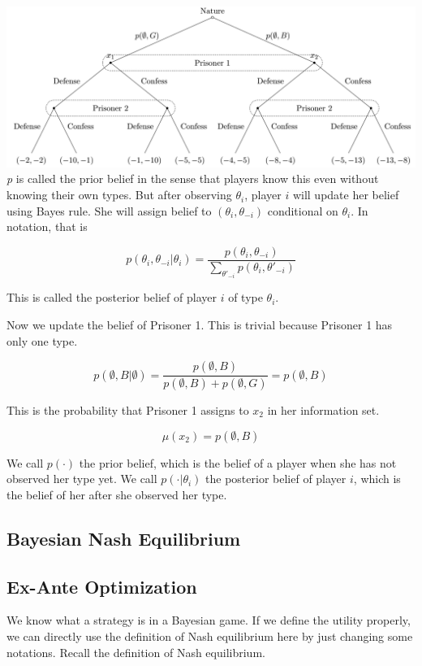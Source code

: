 \documentclass[12pt, oneside]{article}
\begin{document}
\includegraphics{Figure/incom_tree_bey2.png}
\textit{p} is called the prior belief in the sense that players know this even without knowing their own types. But after observing \( \theta_i \), player \( i \) will update her belief using Bayes rule. She will assign belief to \( (\theta_i, \theta_{-i}) \) conditional on \( \theta_i \). In notation, that is

\[
p(\theta_i, \theta_{-i} | \theta_i) = \frac{p(\theta_i, \theta_{-i})}{\sum_{\theta'_{-i}} p(\theta_i, \theta'_{-i})}
\]

This is called the posterior belief of player \( i \) of type \( \theta_i \).

Now we update the belief of Prisoner 1. This is trivial because Prisoner 1 has only one type.

\[
p(\emptyset, B | \emptyset) = \frac{p(\emptyset, B)}{p(\emptyset, B) + p(\emptyset, G)} = p(\emptyset, B)
\]

This is the probability that Prisoner 1 assigns to \( x_2 \) in her information set.

\[
\mu(x_2) = p(\emptyset, B)
\]

We call \( p(\cdot) \) the prior belief, which is the belief of a player when she has not observed her type yet. We call \( p(\cdot | \theta_i) \) the posterior belief of player \( i \), which is the belief of her after she observed her type.

\subsection{Bayesian Nash Equilibrium}
\subsection{Ex-Ante Optimization}
We know what a strategy is in a Bayesian game. If we define the utility properly, we can directly use the definition of Nash equilibrium here by just changing some notations. Recall the definition of Nash equilibrium.
\end{document}
